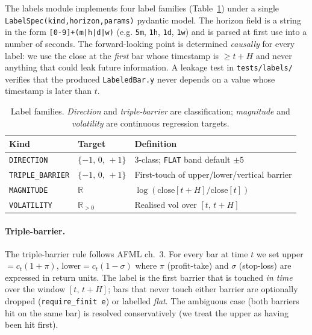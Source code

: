 \documentclass[11pt,a4paper]{article}
\providecommand{\bps}{\,\text{bps}}
\begin{document}
The labels module implements four label families
(Table~\ref{tab:labels}) under a single
\texttt{LabelSpec(kind,\;horizon,\;params)} pydantic model. The
horizon field is a string in the form
\texttt{[0-9]+(m|h|d|w)} (e.g. \texttt{5m}, \texttt{1h},
\texttt{1d}, \texttt{1w}) and is parsed at first use into a
number of seconds. The forward-looking point is determined
\emph{causally} for every label: we use the close at the
\emph{first} bar whose timestamp is $\geq t + H$ and never
anything that could leak future information. A leakage test
in \texttt{tests/labels/} verifies that the produced
\texttt{LabeledBar.y} never depends on a value whose timestamp
is later than $t$.

\begin{table}[htbp]
\centering
\small
\caption{Label families. \emph{Direction} and \emph{triple-barrier}
are classification; \emph{magnitude} and \emph{volatility} are
continuous regression targets.}
\label{tab:labels}
\begin{tabularx}{\linewidth}{@{}lXl@{}}
\toprule
\textbf{Kind} & \textbf{Target} & \textbf{Definition}\\
\midrule
\texttt{DIRECTION}        & $\{-1,\,0,\,+1\}$    & 3-class; \texttt{FLAT} band default $\pm 5$ \bps\\
\texttt{TRIPLE\_BARRIER}  & $\{-1,\,0,\,+1\}$    & First-touch of upper/lower/vertical barrier\\
\texttt{MAGNITUDE}        & $\mathbb{R}$         & $\log(\text{close}[t{+}H]/\text{close}[t])$\\
\texttt{VOLATILITY}       & $\mathbb{R}_{>0}$    & Realised vol over $[t,\,t{+}H]$\\
\bottomrule
\end{tabularx}
\end{table}

\paragraph{Triple-barrier.}
The triple-barrier rule follows AFML ch.~3. For every bar at
time $t$ we set upper$=c_t(1+\pi)$, lower$=c_t(1-\sigma)$ where
$\pi$ (profit-take) and $\sigma$ (stop-loss) are expressed in
return units. The label is the first barrier that is touched
\emph{in time} over the window $[t,\,t{+}H]$; bars that never
touch either barrier are optionally dropped
(\texttt{require\_finit e}) or labelled \emph{flat}. The
ambiguous case (both barriers hit on the same bar) is resolved
conservatively (we treat the upper as having been hit first).
\end{document}
